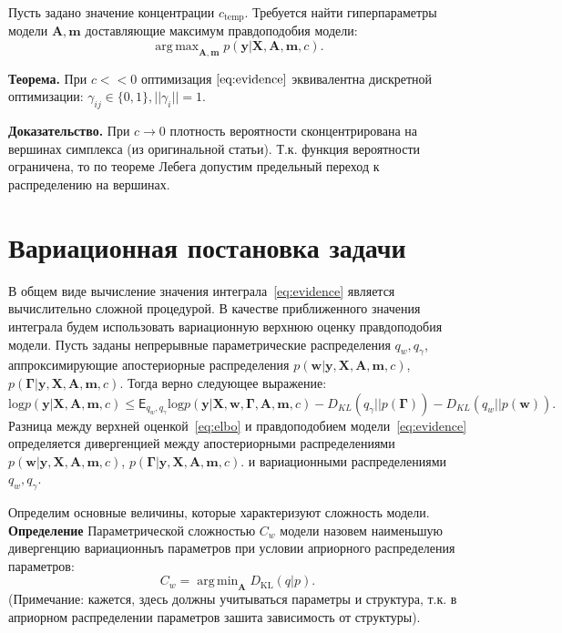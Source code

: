 \documentclass[12pt]{article}
\DeclareMathOperator*{\argmin}{arg\,min}
\DeclareMathOperator*{\argmax}{arg\,max}
\begin{document}
Пусть задано значение концентрации $c_{\text{temp}}$. 
Требуется найти гиперпараметры модели $\mathbf{A}, \mathbf{m}$ доставляющие максимум правдоподобия модели:
\[
    \argmax_{\mathbf{A}, \mathbf{m}}  p(\mathbf{y}|\mathbf{X},\mathbf{A},\mathbf{m}, c).
\]

\textbf{Теорема.} При $c << 0$ оптимизация  $\eqref{eq:evidence}$ эквивалентна дискретной оптимизации: $\gamma_{ij} \in \{0, 1\}, ||\gamma_i|| = 1$. 

\textbf{Доказательство.} При $c \to 0$ плотность вероятности сконцентрирована на вершинах симплекса (из оригинальной статьи). Т.к. функция вероятности ограничена, то по теореме Лебега допустим предельный переход к распределению на вершинах.  


\section{Вариационная постановка задачи}
В общем виде вычисление значения интеграла~\eqref{eq:evidence} является вычислительно сложной процедурой. В качестве приближенного значения интеграла будем использовать вариационную верхнюю оценку правдоподобия модели. Пусть заданы непрерывные параметрические распределения $q_w, q_\gamma$, аппроксимирующие апостериорные распределения $p(\mathbf{w}|\mathbf{y}, \mathbf{X}, \mathbf{A},\mathbf{m}, c)$, $p(\boldsymbol{\Gamma}|\mathbf{y}, \mathbf{X}, \mathbf{A},\mathbf{m}, c).$ Тогда верно следующее выражение:
\begin{equation}
\label{eq:elbo}
    \text{log} p(\mathbf{y}|\mathbf{X},\mathbf{A},\mathbf{m}, c)  \leq \mathsf{E}_{q_w,q_\gamma}\text{log} p(\mathbf{y}|\mathbf{X},\mathbf{w}, \boldsymbol{\Gamma}, \mathbf{A},\mathbf{m}, c) - {D_{KL}}(q_\gamma||p(\boldsymbol{\Gamma})) - {D_{KL}}(q_{w}||p(\mathbf{w})).
\end{equation}
Разница между верхней оценкой~\eqref{eq:elbo} и правдоподобием модели~\eqref{eq:evidence} определяется дивергенцией между апостериорными распределениями $p(\mathbf{w}|\mathbf{y}, \mathbf{X}, \mathbf{A},\mathbf{m}, c)$, $p(\boldsymbol{\Gamma}|\mathbf{y}, \mathbf{X}, \mathbf{A},\mathbf{m}, c).$ и вариационными распределениями  $q_w, q_\gamma$.

Определим основные величины, которые характеризуют сложность модели. \\
\textbf{Определение} Параметрической сложностью $C_w$ модели назовем наименьшую дивергенцию вариационныъ параметров  при условии априорного распределения параметров:
\[
    C_w = \argmin_\mathbf{A} D_\text{KL}\left(q|p\right).
\]
(Примечание: кажется, здесь должны учитываться параметры и структура, т.к. в априорном распределении параметров зашита зависимость от структуры).
\end{document}
